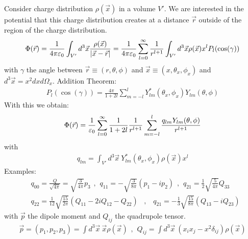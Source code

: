 Consider charge distribution $\rho(\vec{x})$ in a volume $V'$. We are
interested in the potential that this charge distribution creates at a
distance $\vec{r}$ outside of the region of the charge distribution.
\begin{align*}
    \Phi(\vec{r}) = \frac{1}{4 \pi \varepsilon_0} \int_{V'} d^3 \vec{x} \frac{\rho(\vec{x})}{\left\vert \vec{x} - \vec{r} \right\vert}
    = \frac{1}{4 \pi \varepsilon_0} \sum_{l=0}^\infty \frac{1}{r^{l+1}} \int_{V'} d^3 \vec{x} \rho(\vec{x}) x^l P_l (\cos(\gamma))
\end{align*}
with $\gamma$ the angle between $\vec{r} \equiv (r,\theta,\phi)$ and
$\vec{x} \equiv (x,\theta_x,\phi_x)$ and $d^3 \vec{x} = x^2 dx d \Omega_x$.
Addition Theorem:
\begin{align*}
    P_l (\cos(\gamma)) = \frac{4 \pi}{1+2l} \sum_{m=-l}^l Y_{lm}^\ast (\theta_x,\phi_x) Y_{lm} (\theta,\phi)
\end{align*}
With this we obtain:
\begin{align*}
    \Phi(\vec{r}) = \frac{1}{\varepsilon_0} \sum_{l=0}^\infty \frac{1}{1+2l} \frac{1}{r^{l+1}}
        \sum_{m=-l}^l \frac{q_{lm} Y_{lm}(\theta,\phi)}{r^{l+1}}
\end{align*}
with
\begin{align*}
    q_{lm} = \int_{V'} d^3 \vec{x} \ Y_{lm}^\ast (\theta_x,\phi_x) \rho(\vec{x}) x^l
\end{align*}
Examples:
\begin{align*}
    &q_{00} = \frac{Q}{\sqrt{4 \pi}} = \sqrt{\frac{3}{4 \pi}} p_3
    \hspace{5pt} , \hspace{5pt}
    q_{11} = - \sqrt{\frac{3}{8 \pi}} (p_1 - i p_2)
    \hspace{5pt} , \hspace{5pt}
    q_{21} = \frac{1}{2} \sqrt{\frac{5}{4 \pi}} Q_{33}
    \\
    &q_{22} = \frac{1}{12} \sqrt{\frac{15}{2 \pi}} (Q_{11} - 2i Q_{12} - Q_{22})
    \hspace{10pt} , \hspace{10pt}
    q_{21} = - \frac{1}{3} \sqrt{\frac{15}{8 \pi}} (Q_{13} - i Q_{23})
\end{align*}
with $\vec{p}$ the dipole moment and $Q_{ij}$ the quadrupole tensor.
\begin{align*}
    \vec{p} = (p_1,p_2,p_3) = \int d^3 \vec{x} \ \vec{x} \rho(\vec{x})
    \hspace{5pt} , \hspace{5pt}
    Q_{ij} = \int d^3 \vec{x} \ (x_i x_j - x^2 \delta_{ij}) \rho(\vec{x})
\end{align*}

